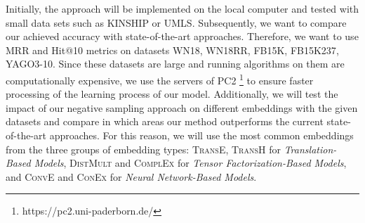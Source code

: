 Initially, the approach will be implemented on the local computer and tested with small data sets such as \textsc{KINSHIP} or \textsc{UMLS}.
Subsequently, we want to compare our achieved accuracy with state-of-the-art approaches.
Therefore, we want to use \ac{MRR} and Hit@10 metrics on datasets \textsc{WN18}, \textsc{WN18RR}, \textsc{FB15K}, \textsc{FB15K237}, \textsc{YAGO3-10}.
Since these datasets are large and running algorithms on them are computationally expensive, we use the servers of \ac{PC2} \footnote{https://pc2.uni-paderborn.de/} to ensure faster processing of the learning process of our model.
Additionally, we will test the impact of our negative sampling approach on different embeddings with the given datasets and compare in which areas our method outperforms the current state-of-the-art approaches.
For this reason, we will use the most common embeddings from the three groups of embedding types:
\textsc{TransE}, \textsc{TransH} for \textit{Translation-Based Models}, \textsc{DistMult} and \textsc{ComplEx} for \textit{Tensor Factorization-Based Models}, and \textsc{ConvE} and \textsc{ConEx} for \textit{Neural Network-Based Models}.



